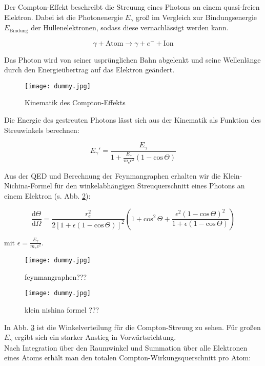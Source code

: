 Der Compton-Effekt beschreibt die Streuung eines Photons an einem quasi-freien Elektron. Dabei ist
die Photonenergie $E_\gamma$ groß im Vergleich zur Bindungsenergie $E_{\text{Bindung}}$ der
Hüllenelektronen, sodass diese vernachlässigt werden kann.

\[ \gamma + \text{Atom} \longrightarrow \gamma + e^- +\text{Ion}\]

Das Photon wird von seiner usprünglichen Bahn abgelenkt und seine Wellenlänge durch den
Energieübertrag auf das Elektron geändert. 

\begin{figure}[H]
	\centering
	\texttt{[image: dummy.jpg]}
	\caption{Kinematik des Compton-Effekts	}
	\label{}
\end{figure}

Die Energie des gestreuten Photons lässt sich aus der Kinematik als Funktion des Streuwinkels
berechnen:

\[ E_\gamma' = \frac{E_\gamma}{1+ \frac{E_\gamma}{m_ec^2}\left(1-\text{cos}\,\Theta\right)} \]

Aus der QED und Berechnung der Feynmangraphen erhalten wir die Klein-Nichina-Formel für den
winkelabhängigen Streuquerschnitt eines Photons an einem Elektron (s. Abb. \ref{fgraph2}):

\[ \frac{\mathrm{d}\Theta}{\mathrm{d}\Omega} = \frac{r_e^2}{2
\left[1+\epsilon\left(1-\text{cos}\,\Theta \right) \right]^2} \left(1+\text{cos}^2\,\Theta +
\frac{\epsilon^2\left(1-\text{cos}\,\Theta \right)^2}{1+\epsilon\left(1- \text{cos}\,\Theta \right)}
\right)
\]

mit $\epsilon = \frac{E_\gamma}{m_ec^2}$.

\begin{figure}[H]
	\centering
	\texttt{[image: dummy.jpg]}
	\caption{feynmangraphen???	}
	\label{fgraph2}
\end{figure}

\begin{figure}[H]
	\centering
	\texttt{[image: dummy.jpg]}
	\caption{	klein nishina formel ???}
	\label{kleinnishina}
\end{figure}

In Abb. \ref{kleinnishina} ist die Winkelverteilung für die Compton-Streuug zu sehen. Für großen
$E_\gamma$ ergibt sich ein starker Anstieg in Vorwärtsrichtung.
\\
Nach Integration über den Raumwinkel und Summation über alle Elektronen eines Atoms erhält man den
totalen Compton-Wirkungsquerschnitt pro Atom:

